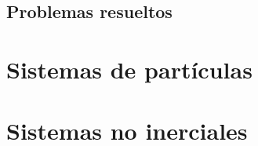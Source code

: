 \documentclass[/home/hernan/Documentos/Apuntes_mecanica_teorica/main.tex]{subfiles}
\begin{document}
	\begin{theorem}
		
	\end{theorem}

	\begin{theorem}
		
	\end{theorem}

	\subsection{Problemas resueltos}

	\section{Sistemas de partículas}
	\label{sec: sisparticulas}
	
	\section{Sistemas no inerciales}
	\label{sec: noinerciales}
\end{document}
